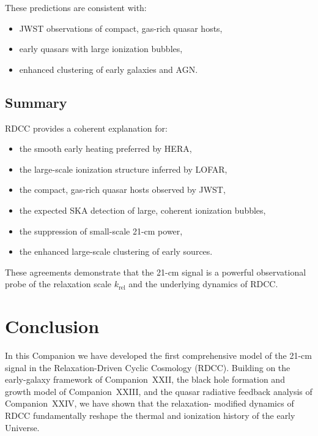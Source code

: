 \documentclass[11pt,a4paper]{article}
\begin{document}
These predictions are consistent with:
\begin{itemize}
\item JWST observations of compact, gas-rich quasar hosts,
\item early quasars with large ionization bubbles,
\item enhanced clustering of early galaxies and AGN.
\end{itemize}

\subsection{Summary}

RDCC provides a coherent explanation for:
\begin{itemize}
\item the smooth early heating preferred by HERA,
\item the large-scale ionization structure inferred by LOFAR,
\item the compact, gas-rich quasar hosts observed by JWST,
\item the expected SKA detection of large, coherent ionization bubbles,
\item the suppression of small-scale 21-cm power,
\item the enhanced large-scale clustering of early sources.
\end{itemize}

These agreements demonstrate that the 21-cm signal is a powerful observational probe of
the relaxation scale $k_{\mathrm{rel}}$ and the underlying dynamics of RDCC.

\section{Conclusion}

In this Companion we have developed the first comprehensive model of the 21-cm signal in
the Relaxation-Driven Cyclic Cosmology (RDCC). Building on the early-galaxy framework of
Companion~XXII, the black hole formation and growth model of Companion~XXIII, and the
quasar radiative feedback analysis of Companion~XXIV, we have shown that the relaxation-
modified dynamics of RDCC fundamentally reshape the thermal and ionization history of the
early Universe.
\end{document}
